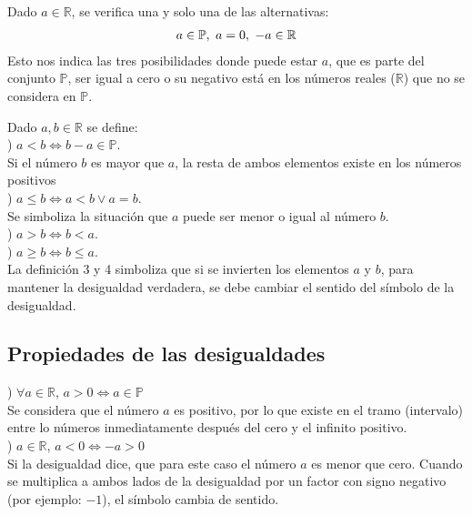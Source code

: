 \noindent Dado $a\in\mathbb{R}$, se verifica una y solo una de las alternativas:\\
\begin{eqnarray*}
a\in\mathbb{P}, \hspace{3px} a=0, \hspace{3px} -a\in\mathbb{R}
\end{eqnarray*}
Esto nos indica las tres posibilidades donde puede estar $a$, que es parte del conjunto $\mathbb{P}$, ser igual a cero o su negativo está en los números reales ($\mathbb{R}$) que no se considera en $\mathbb{P}$.
\begin{mydef}
Dado $a,b\in\mathbb{R}$ se define:\\

) $a<b\Leftrightarrow b-a\in\mathbb{P}$.\\
Si el número $b$ es mayor que $a$, la resta de ambos elementos existe en los números positivos\\

) $a\leq b\Leftrightarrow a<b\vee a=b$. \\
Se simboliza la situación que $a$ puede ser menor o igual al número $b$.\\

) $a>b\Leftrightarrow b<a$. \\

) $a\geq b\Leftrightarrow b\leq a$. \\
La definición 3 y 4 simboliza que si se invierten los elementos $a$ y $b$, para mantener la desigualdad verdadera, se debe cambiar el sentido del símbolo de la desigualdad.
\end{mydef}
\newpage
\subsection{Propiedades de las desigualdades}

) $\forall a\in\mathbb{R}$, $a>0\Leftrightarrow a\in\mathbb{P}$ \\
Se considera que el número $a$ es positivo, por lo que existe en el tramo (intervalo) entre lo números inmediatamente después del cero y el infinito positivo.\\

) $a\in\mathbb{R}$,  $a<0\Leftrightarrow -a>0$ \\
Si la desigualdad dice, que para este caso el número $a$ es menor que cero. Cuando se multiplica a ambos lados de la desigualdad por un factor con signo negativo (por ejemplo: $-1$), el símbolo cambia de sentido.\\

